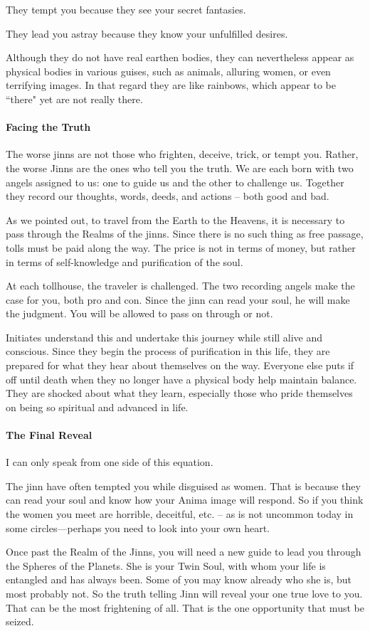 They tempt you because they see your secret fantasies.

They lead you astray because they know your unfulfilled desires.

Although they do not have real earthen bodies, they can nevertheless appear as physical bodies in various guises, such as animals, alluring women, or even terrifying images. In that regard they are like rainbows, which appear to be ``there" yet are not really there.

\paragraph{Facing the Truth}
The worse jinns are not those who frighten, deceive, trick, or tempt you. Rather, the worse Jinns are the ones who tell you the truth. We are each born with two angels assigned to us: one to guide us and the other to challenge us. Together they record our thoughts, words, deeds, and actions – both good and bad.

As we pointed out, to travel from the Earth to the Heavens, it is necessary to pass through the Realms of the jinns. Since there is no such thing as free passage, tolls must be paid along the way. The price is not in terms of money, but rather in terms of self-knowledge and purification of the soul.

At each tollhouse, the traveler is challenged. The two recording angels make the case for you, both pro and con. Since the jinn can read your soul, he will make the judgment. You will be allowed to pass on through or not.

Initiates understand this and undertake this journey while still alive and conscious. Since they begin the process of purification in this life, they are prepared for what they hear about themselves on the way. Everyone else puts if off until death when they no longer have a physical body help maintain balance. They are shocked about what they learn, especially those who pride themselves on being so spiritual and advanced in life.

\paragraph{The Final Reveal}
I can only speak from one side of this equation.

The jinn have often tempted you while disguised as women. That is because they can read your soul and know how your Anima image will respond. So if you think the women you meet are horrible, deceitful, etc. – as is not uncommon today in some circles—perhaps you need to look into your own heart.

Once past the Realm of the Jinns, you will need a new guide to lead you through the Spheres of the Planets. She is your Twin Soul, with whom your life is entangled and has always been. Some of you may know already who she is, but most probably not. So the truth telling Jinn will reveal your one true love to you. That can be the most frightening of all. That is the one opportunity that must be seized.



